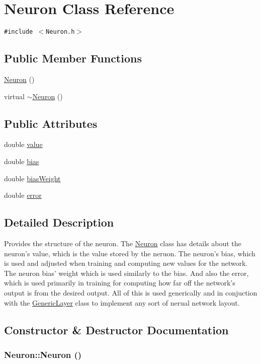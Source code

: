\hypertarget{classNeuron}{
\section{Neuron Class Reference}
\label{classNeuron}
}
{\tt \#include $<$Neuron.h$>$}

\subsection*{Public Member Functions}
\begin{CompactItemize}
\item 
\hyperlink{classNeuron_823487d01615fadb8ac19a2768dd9d96}{Neuron} ()
\item 
virtual \hyperlink{classNeuron_94a250ce7e167760e593979b899745b1}{$\sim$Neuron} ()
\end{CompactItemize}
\subsection*{Public Attributes}
\begin{CompactItemize}
\item 
double \hyperlink{classNeuron_e1988ffe53bfd53ce979aecf01a164e3}{value}
\item 
double \hyperlink{classNeuron_7dc59218069023c3b8348a353902b0ac}{bias}
\item 
double \hyperlink{classNeuron_27aa94b5d7658f718711cedb3f96dc7f}{biasWeight}
\item 
double \hyperlink{classNeuron_d4d851d9f4f5dccb6283e5c19726e1e7}{error}
\end{CompactItemize}


\subsection{Detailed Description}
Provides the structure of the neuron. The \hyperlink{classNeuron}{Neuron} class has details about the neuron's value, which is the value stored by the neruon. The neuron's bias, which is used and adjusted when training and computing new values for the network. The neuron bias' weight which is used similarly to the bias. And also the error, which is used primarily in training for computing how far off the network's output is from the desired output. All of this is used generically and in conjuction with the \hyperlink{classGenericLayer}{GenericLayer} class to implement any sort of nerual network layout. 

\subsection{Constructor \& Destructor Documentation}
\hypertarget{classNeuron_823487d01615fadb8ac19a2768dd9d96}{
\subsubsection{\setlength{\rightskip}{0pt plus 5cm}Neuron::Neuron ()}}
\label{classNeuron_823487d01615fadb8ac19a2768dd9d96}


